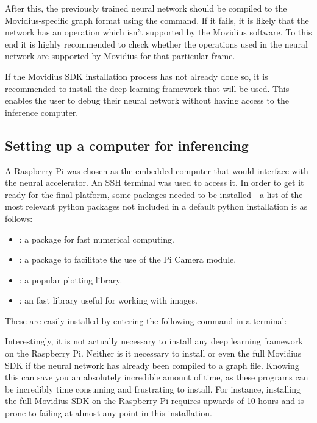 After this, the previously trained neural network should be compiled to the Movidius-specific graph format using the  command. If it fails, it is likely that the network has an operation which isn't supported by the Movidius software. To this end it is highly recommended to check whether the operations used in the neural network are supported by Movidius for that particular frame.

If the Movidius SDK installation process has not already done so, it is recommended to install the deep learning framework that will be used. This enables the user to debug their neural network without having access to the inference computer.


\subsection{Setting up a computer for inferencing}
A Raspberry Pi was chosen as the embedded computer that would interface with the neural accelerator. An SSH terminal was used to access it. In order to get it ready for the final platform, some packages needed to be installed - a list of the most relevant python packages not included in a default python installation is as follows:

\begin{itemize}
	\item {}: a package for fast numerical computing.
	\item {}: a package to facilitate the use of the Pi Camera module.
	\item {}: a popular plotting library.
	\item {}: an fast library useful for working with images.
\end{itemize}

These are easily installed by entering the following command in a terminal:\\

Interestingly, it is not actually necessary to install any deep learning framework on the Raspberry Pi. Neither is it necessary to install  or even the full Movidius SDK if the neural network has already been compiled to a graph file. Knowing this can save you an absolutely incredible amount of time, as these programs can be incredibly time consuming and frustrating to install. For instance, installing the full Movidius SDK on the Raspberry Pi requires upwards of 10 hours and is prone to failing at almost any point in this installation.

